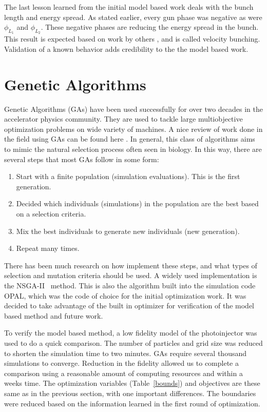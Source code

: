 \documentclass[letterpaper,  %
              ]{jacow-2_3}   %
\begin{document}
The last lesson learned from the initial model based work deals with the bunch length
and energy spread. As stated earlier, every gun phase was negative as were 
$\phi_{L_1}$ and $\phi_{L_2}$. These negative phases are reducing the 
energy spread in the bunch. This result is expected based on work by others \cite{lclsii}, 
and is called velocity bunching. Validation of a known behavior adds 
credibility to the the model based work.

\section{Genetic Algorithms}
Genetic Algorithms (GAs) have been used successfully for over two decades
in the accelerator physics community.
They are used to tackle large multiobjective optimization problems on wide variety of machines.  
A nice review of work done in the field using GAs can be found here \cite{hofler}. 
In general, this class of algorithms aims to mimic the natural selection 
process often seen in biology. In this way, there are several
steps that most GAs follow in some form:
\begin{enumerate}
	\item Start with a finite population (simulation evaluations). This is the first generation.
	\item Decided which individuals (simulations) in the population 
	are the best based on a selection criteria.
	\item Mix the best individuals to generate new individuals (new generation).
	\item Repeat many times.
\end{enumerate}

There has been much research on how implement these steps, 
and what types of selection and mutation criteria should be used.
A widely used implementation is the \mbox{NSGA-II}~\cite{nsgaii} method.
This is also the algorithm built into the simulation code 
OPAL, which was the code of choice for the initial 
optimization work. It was decided to take advantage of the 
built in optimizer for verification of the model based 
method and future work.

To verify the model based method, a low fidelity model 
of the photoinjector was used to do a quick comparison.
The number of particles and grid size was reduced to 
shorten the simulation time to two minutes. 
GAs require several thousand simulations to converge. 
Reduction in the fidelity 
allowed us to complete a comparison using a reasonable 
amount of computing resources and within a weeks time.
The optimization variables (Table~\ref{bounds}) 
and objectives are these same as in the previous section, 
with one important differences. The boundaries were 
reduced based on the information learned in the first
round of optimization.
\end{document}
